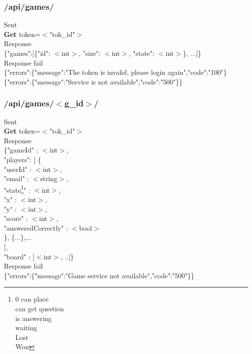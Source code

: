 \subsubsection{/api/games/}
\tab	Sent\\
\tab\tab	\textbf{Get} token=$<$"tok\_id"$>$\\
\tab	Response\\
\tab\tab	\{"games":$[$\{"id": $<$int$>$, "size": $<$int$>$, "state": $<$int$>$\}, ...$]$\}\\
\tab	Response fail\\
\tab\tab	\{"errors":\{"message":"The token is invalid, please login again","code":"100"\}\\
\tab\tab	\{"errors":\{"message":"Service is not available","code":"500"\}\}\\

\subsubsection{/api/games/$<$g\_id$>$/\label{statehere}}
\tab	Sent\\
\tab\tab	\textbf{Get} token=$<$"tok\_id"$>$\\
\tab	Response\\
\tab\tab	\{"gameId" : $<$int$>$, \\
\tab\tab	"players": $[$     \{     \\
\tab\tab\tab	"userId" : $<$int$>$,\\
\tab\tab\tab	"email" : $<$string$>$,\\
\tab\tab\tab	"state\footnote{0 can place\\ can get question\\ is answering\\ waiting\\ Lost\\ Won}" : $<$int$>$,\\
\tab\tab\tab	"x" : $<$int$>$,\\
\tab\tab\tab	"y" : $<$int$>$,\\
\tab\tab\tab	"score" : $<$int$>$,\\
\tab\tab\tab	"answeredCorrectly" : $<$bool$>$\\
\tab\tab\tab	\}, \{...\},...\\
\tab\tab	$]$,\\
\tab\tab	"board" : $[$$<$int$>$, ..$]$\}\\
\tab	Response fail\\
\tab\tab	\{"errors":\{"message":"Game service not available","code":"500"\}\}\\


